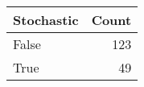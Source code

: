 \begin{tabular}{lr}
\toprule
Stochastic &  Count \\
\midrule
     False &    123 \\
      True &     49 \\
\bottomrule
\end{tabular}
